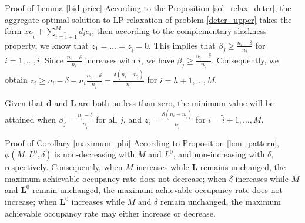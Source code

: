 \begin{pf}{Proof of Lemma \ref{bid-price}}
According to the Proposition \ref{sol_relax_deter}, the aggregate optimal solution to LP relaxation of problem \eqref{deter_upper} takes the form $x e_{\tilde{i}} + \sum_{i=\tilde{i}+1} ^{M} d_{i} e_{i}$, then according to the complementary slackness property, we know that $z_1= \ldots= z_{\tilde{i}} = 0$. This implies that $\beta_j \geq \frac{n_i - \delta}{n_i}$ for $i = 1,\ldots, \tilde{i}$. Since $\frac{n_i - \delta}{n_i}$ increases with $i$, we have $\beta_j \geq \frac{n_{\tilde{i}} - \delta}{n_{\tilde{i}}}$. Consequently, we obtain $z_{i} \geq n_i - \delta - n_i \frac{n_{\tilde{i}} - \delta}{n_{\tilde{i}}} = \frac{\delta(n_i-n_{\tilde{i}})}{n_{\tilde{i}}}$ for $i = h+1, \ldots, M$.

Given that $\mathbf{d}$ and $\mathbf{L}$ are both no less than zero, the minimum value will be attained when $\beta_j = \frac{n_{\tilde{i}} - \delta}{n_{\tilde{i}}}$ for all $j$, and $z_i = \frac{\delta(n_i-n_{\tilde{i}})}{n_{\tilde{i}}}$ for $i = \tilde{i}+1, \ldots, M$.  
\end{pf}

\begin{pf}{Proof of Corollary \ref{maximum_phi}}
According to Proposition \ref{lem_pattern}, $\phi(M, L^{0}, \delta)$ is non-decreasing with $M$ and  $L^{0}$, and non-increasing with $\delta$, respectively. Consequently, when $M$ increases while $\bm{L}$ remains unchanged, the maximum achievable occupancy rate does not decrease; when $\delta$ increases while $M$ and $\bm{L}^{0}$ remain unchanged, the maximum achievable occupancy rate does not increase; when $\bm{L}^{0}$ increases while $M$ and $\delta$ remain unchanged, the maximum achievable occupancy rate may either increase or decrease.

\end{pf}

\newpage
